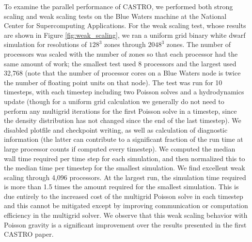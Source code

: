 \documentclass[iop]{emulateapj}
\begin{document}
To examine the parallel performance of CASTRO, we performed both strong scaling 
and weak scaling tests on the Blue Waters machine at the National Center for 
Supercomputing Applications. For the weak scaling test, whose results are 
shown in Figure \ref{fig:weak_scaling}, we ran a uniform grid binary white 
dwarf simulation for resolutions of $128^3$ zones through $2048^3$ zones. The 
number of processors was scaled with the number of zones so that each processor 
had the same amount of work; the smallest test used 8 processors and the largest 
used 32,768 (note that the number of processor cores on a Blue Waters node is twice 
the number of floating point units on that node). The test was run for 10 timesteps,
with each timestep including two Poisson solves and a hydrodynamics update (though 
for a uniform grid calculation we generally do not need to perform any multigrid 
iterations for the first Poisson solve in a timestep, since the density distribution 
has not changed since the end of the last timestep). We disabled plotfile and 
checkpoint writing, as well as calculation of diagnostic information (the latter 
can contribute to a significant fraction of the run time at large processor 
counts if computed every timestep). We computed the median wall time required per 
time step for each simulation, and then normalized this to the median time per 
timestep for the smallest simulation. We find excellent weak scaling through 
4,096 processors. At the largest run, the simulation time required is 
more than 1.5 times the amount required for the smallest simulation. 
This is due entirely to the increased cost of the multigrid Poisson solve 
in each timestep and this cannot be mitigated except by improving 
communication or computation efficiency in the multigrid solver. We observe 
that this weak scaling behavior with Poisson gravity is a significant 
improvement over the results presented in the first CASTRO paper.
\end{document}
